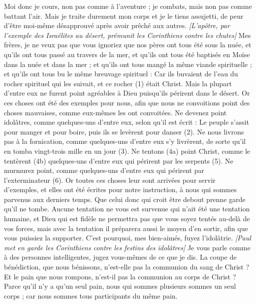 \begin{multicols}{2}
Moi donc je cours, non pas comme à l’aventure ; je combats, mais non pas comme battant l'air.
Mais je traite durement mon corps et je le tiens assujetti, de peur d’être moi-même désapprouvé après avoir prêché aux autres.
\textit{[L'apôtre, par l'exemple des Israélites au désert, prémunit les Corinthiens contre les chutes]}
\VerseOne{}Mes frères, je ne veux pas que vous ignoriez que nos pères ont tous été sous la nuée, et qu'ils ont tous passé au travers de la mer,
et qu'ils ont tous été baptisés en Moïse dans la nuée et dans la mer ;
et qu'ils ont tous mangé la même viande spirituelle ;
et qu'ils ont tous bu le même breuvage spirituel : Car ils buvaient de l'eau du rocher spirituel qui les suivait, et ce rocher (1) était Christ.
Mais la plupart d’entre eux ne furent point agréables à Dieu puisqu’ils périrent dans le désert.
Or ces choses ont été des exemples pour nous, afin que nous ne convoitions point des choses mauvaises, comme eux-mêmes les ont convoitées.
Ne devenez point idolâtres, comme quelques-uns d’entre eux, selon qu'il est écrit : Le peuple s’assit pour manger et pour boire, puis ils se levèrent pour danser (2).
Ne nous livrons pas à la fornication, comme quelques-uns d’entre eux s’y livrèrent, de sorte qu’il en tomba vingt-trois mille en un jour (3).
Ne tentons (4a) point Christ, comme le tentèrent (4b) quelques-uns d’entre eux qui périrent par les serpents (5).
Ne murmurez point, comme quelques-uns d’entre eux qui périrent par l’exterminateur (6).
Or toutes ces choses leur sont arrivées pour servir d’exemples, et elles ont été écrites pour notre instruction, à nous qui sommes parvenus aux derniers temps.
Que celui donc qui croit être debout prenne garde qu'il ne tombe.
Aucune tentation ne vous est survenue qui n’ait été une tentation humaine, et Dieu qui est fidèle ne permettra pas que vous soyez tentés au-delà de vos forces, mais avec la tentation il préparera aussi le moyen d’en sortir, afin que vous puissiez la supporter.
C'est pourquoi, mes bien-aimés, fuyez l'idolâtrie.
\textit{[Paul met en garde les Corinthiens contre les festins des idolâtres]}
Je vous parle comme à des personnes intelligentes, jugez vous-mêmes de ce que je dis.
La coupe de bénédiction, que nous bénissons, n'est-elle pas la communion du sang de Christ ? Et le pain que nous rompons, n'est-il pas la communion au corps de Christ ?
Parce qu'il n'y a qu'un seul pain, nous qui sommes plusieurs sommes un seul corps ; car nous sommes tous participants du même pain.

\end{multicols}
